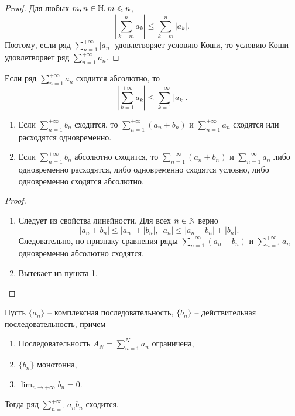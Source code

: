 \begin{proof}
    Для любых $m, n \in \mathbb{N}, m \leqslant n$,
    \[\left|\sum_{k = m}^{n} a_{k}\right| \leq \sum_{k = m}^{n}|a_{k}|.\]
    Поэтому, если ряд $\sum_{n = 1}^{+\infty} |a_{n}|$ удовлетворяет условию Коши, то условию Коши удовлетворяет ряд $\sum_{n = 1}^{+\infty}a_{n}$. 
\end{proof}

\begin{note}
    Если ряд $\sum_{n = 1}^{+\infty}a_{n}$ сходится абсолютно, то
    \[\left|\sum_{k = 1}^{+\infty} a_{k}\right| \leq \sum_{k = 1}^{+\infty}|a_{k}|.\]
\end{note}

\begin{lemma}
    \begin{enumerate}
        \item Если $\sum_{n = 1}^{+\infty} b_{n}$ сходится, то $\sum_{n = 1}^{+\infty} (a_{n} + b_{n})$ и $\sum_{n = 1}^{+\infty} a_{n}$ сходятся или расходятся одновременно.
        \item Если $\sum_{n = 1}^{+\infty} b_{n}$ абсолютно сходится, то $\sum_{n = 1}^{+\infty} (a_{n} + b_{n})$ и $\sum_{n = 1}^{+\infty} a_{n}$ либо одновременно расходятся, либо одновременно сходятся условно, либо одновременно сходятся абсолютно.
    \end{enumerate}
\end{lemma}

\begin{proof}~

    \begin{enumerate}
        \item Следует из свойства линейности. Для всех $n \in \mathbb{N}$ верно
        \[|a_{n} + b_{n}| \leq |a_{n}| + |b_{n}|, \ |a_{n}| \leq |a_{n} + b_{n}| + |b_{n}|.\]
        Следовательно, по признаку сравнения ряды $\sum_{n = 1}^{+\infty} (a_{n} + b_{n})$ и $\sum_{n = 1}^{+\infty} a_{n}$ одновременно абсолютно сходятся.
        
        \item Вытекает из пункта 1.
    \end{enumerate}
    
\end{proof}

\begin{theorem}
    Пусть $\{a_{n}\}$ -- комплексная последовательность, $\{b_{n}\}$ -- действительная последовательность, причем
    \begin{enumerate}
        \item Последовательность $A_{N} = \sum_{n = 1}^{N} a_{n}$ ограничена,
        \item $\{b_{n}\}$ монотонна,
        \item $\lim_{n \to +\infty} b_{n} = 0$.
    \end{enumerate}
    Тогда ряд $\sum_{n = 1}^{+\infty} a_{n}b_{n}$ сходится.
\end{theorem}

